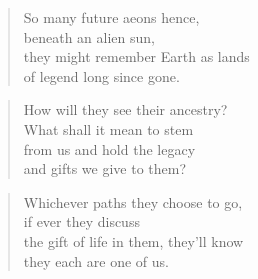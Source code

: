 \documentclass[10pt,a4paper]{article}
\begin{document}
\begin{multicols}{2}
\begin{verse}
So many future aeons hence,\\
beneath an alien sun,\\
they might remember Earth as lands\\
of legend long since gone.
\end{verse}

\begin{verse}
How will they see their ancestry?\\
What shall it mean to stem\\
from us and hold the legacy\\
and gifts we give to them?
\end{verse}

\begin{verse}
Whichever paths they choose to go,\\
if ever they discuss\\
the gift of life in them, they’ll know\\
they each are one of us.
\end{verse}

\end{multicols}
\end{document}
